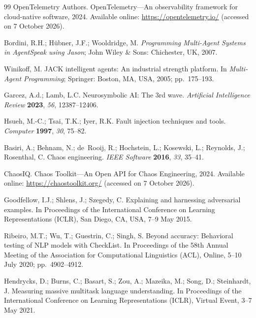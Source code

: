 \documentclass[make,article,submit,moreauthors,pdftex]{mdpi}
\begin{document}
\begin{thebibliography}{99}
OpenTelemetry Authors.
\newblock OpenTelemetry---An observability framework for cloud-native software, 2024.
\newblock Available online: \url{https://opentelemetry.io/} (accessed on 7 October 2026).

Bordini, R.H.; H{\"u}bner, J.F.; Wooldridge, M.
\newblock \textit{Programming Multi-Agent Systems in AgentSpeak using Jason};
\newblock John Wiley \& Sons: Chichester, UK, 2007.

Winikoff, M.
\newblock JACK intelligent agents: An industrial strength platform.
\newblock In \textit{Multi-Agent Programming}; Springer: Boston, MA, USA, 2005; pp.~175--193.

Garcez, A.d.; Lamb, L.C.
\newblock Neurosymbolic AI: The 3rd wave.
\newblock \textit{Artificial Intelligence Review} \textbf{2023}, \textit{56}, 12387--12406.

Hsueh, M.-C.; Tsai, T.K.; Iyer, R.K.
\newblock Fault injection techniques and tools.
\newblock \textit{Computer} \textbf{1997}, \textit{30}, 75--82.

Basiri, A.; Behnam, N.; de~Rooij, R.; Hochstein, L.; Kosewski, L.; Reynolds, J.; Rosenthal, C.
\newblock Chaos engineering.
\newblock \textit{IEEE Software} \textbf{2016}, \textit{33}, 35--41.

ChaosIQ.
\newblock Chaos Toolkit---An Open API for Chaos Engineering, 2024.
\newblock Available online: \url{https://chaostoolkit.org/} (accessed on 7 October 2026).

Goodfellow, I.J.; Shlens, J.; Szegedy, C.
\newblock Explaining and harnessing adversarial examples.
\newblock In Proceedings of the International Conference on Learning Representations (ICLR), San Diego, CA, USA, 7--9 May 2015.

Ribeiro, M.T.; Wu, T.; Guestrin, C.; Singh, S.
\newblock Beyond accuracy: Behavioral testing of NLP models with CheckList.
\newblock In Proceedings of the 58th Annual Meeting of the Association for Computational Linguistics (ACL), Online, 5--10 July 2020; pp.~4902--4912.

Hendrycks, D.; Burns, C.; Basart, S.; Zou, A.; Mazeika, M.; Song, D.; Steinhardt, J.
\newblock Measuring massive multitask language understanding.
\newblock In Proceedings of the International Conference on Learning Representations (ICLR), Virtual Event, 3--7 May 2021.


\end{thebibliography}
\end{document}

